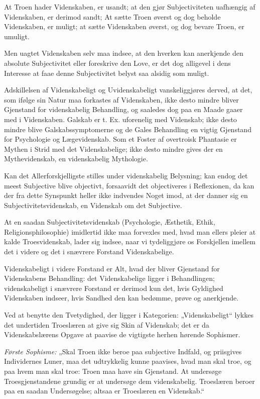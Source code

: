 \documentclass[12pt]{book}
\newcommand{\opage}[1]{\marginnote{\footnotesize\textit{[#1]}}}
\begin{document}
At Troen hader Videnskaben, er usandt; at den gjør Subjectiviteten uafhængig af
Videnskaben, er derimod sandt; At sætte Troen øverst og dog beholde Videnskaben, er
muligt; at sætte Videnskaben øverst, og dog bevare Troen, er umuligt.

\opage{78} Men uagtet Videnskaben selv maa indsee, at den hverken kan anerkjende den absolute
Subjectivitet eller foreskrive den Love, er det dog alligevel i dens Interesse at faae
denne Subjectivitet belyst saa alsidig som muligt.

Adskillelsen af Videnskabeligt og Uvidenskabeligt vanskeliggjøres derved, at det, som
ifølge sin Natur maa forkastes af Videnskaben, ikke desto mindre bliver Gjenstand for
videnskabelig Behandling, og saaledes dog paa en Maade gaaer med i Videnskaben. Galskab
er t. Ex. uforenelig med Videnskab; ikke desto mindre blive Galskabssymptomerne og de
Gales Behandling en vigtig Gjenstand for Psychologie og Lægevidenskab. Som et Foster af
overtroisk Phantasie er Mythen i Strid med det Videnskabelige; ikke desto mindre gives
der en Mythevidenskab, en videnskabelig Mythologie.

Kan det Allerforskjelligste stilles under videnskabelig Belysning; kan endog det meest
Subjective blive objectivt, forsaavidt det objectiveres i Reflexionen, da kan der fra
dette Synspunkt heller ikke indvendes Noget imod, at der danner sig en
Subjectivitetsvidenskab, en Videnskab om det Subjective.

At en saadan Subjectivitetsvidenskab (Psychologie, Æsthetik, Ethik,
Religionsphilosophie) imidlertid ikke maa forvexles med, hvad man ellers pleier at
kalde Troesvidenskab, lader sig indsee, naar vi tydeliggjøre os Forskjellen imellem det
i videre og det i snævrere Forstand Videnskabelige.

Videnskabeligt i videre Forstand er Alt, hvad der bliver Gjenstand for Videnskabens
Behandling: det Videnskabelige ligger i Behandlingen; videnskabeligt i snævrere Forstand
er derimod kun det, hvis Gyldighed Videnskaben indseer, hvis Sandhed den kan bedømme,
prøve og anerkjende.

Ved at benytte den Tvetydighed, der ligger i Kategorien: „Videnskabeligt“ lykkes det
undertiden Troeslæren at give sig Skin af Videnskab; det er da Videnskabslærens Opgave
at paavise de vigtigste herhen hørende Sophismer.

\emph{Første Sophisme:} „Skal Troen ikke beroe paa subjective Indfald, og priisgives
Individernes Luner, maa
\opage{79} det udtrykkelig kunne paavises, hvad man skal troe, og paa hvem man skal troe: Troen
maa have sin Gjenstand. At undersøge Troesgjenstandene grundig er at undersøge dem
videnskabelig. Troeslæren beroer paa en saadan Undersøgelse; altsaa er Troeslæren en
Videnskab.“
\end{document}
